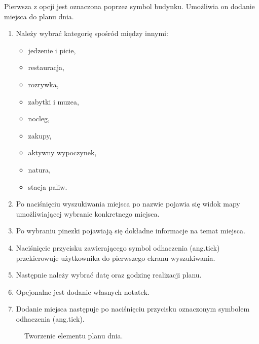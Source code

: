\par Pierwsza z opcji jest oznaczona poprzez symbol budynku.
Umożliwia on dodanie miejsca do planu dnia.

\begin{enumerate}
\item Należy wybrać kategorię spośród między innymi:
\begin{itemize}
\item jedzenie i picie,
\item restauracja,
\item rozrywka,
\item zabytki i muzea,
\item nocleg,
\item zakupy,
\item aktywny wypoczynek,
\item natura,
\item stacja paliw.
\end{itemize}
\item Po naciśnięciu wyszukiwania miejsca po nazwie pojawia się widok mapy umożliwiającej wybranie konkretnego miejsca.
\item Po wybraniu pinezki pojawiają się dokładne informacje na temat miejsca.
\item Naciśnięcie przycisku zawierającego symbol odhaczenia (ang.tick) przekierowuje użytkownika do pierwszego ekranu wyszukiwania.
\item Następnie należy wybrać datę oraz godzinę realizacji planu.
\item Opcjonalne jest dodanie własnych notatek.
\item Dodanie miejsca następuje po naciśnięciu przycisku oznaczonym symbolem odhaczenia (ang.tick).
\end{enumerate}

\begin{figure}[h]

\centering
\null\hfill
{}
\hfill
{}
\hfill
{}
\hfill\null

\null\hfill
\centering
{}
\hfill
{}
\hfill\null
\caption{Tworzenie elementu planu dnia.}
\label{fig:podrecznik7}
\end{figure}
\FloatBarrier

